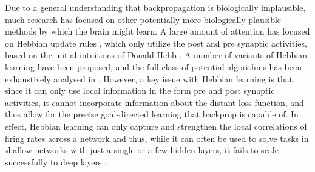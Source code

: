 Due to a general understanding that backpropagation is biologically implausible, much research has focused on other potentially more biologically plausible methods by which the brain might learn. A large amount of attention has focused on Hebbian update rules \citep{gerstner2002mathematical}, which only utilize the post and pre synaptic activities, based on the initial intuitions of Donald Hebb \citep{hebb1949first}. A number of variants of Hebbian learning have been proposed, and the full class of potential algorithms has been exhaustively analysed in \citep{baldi2016theory}. However, a key issue with Hebbian learning is that, since it can only use local information in the form pre and post synaptic activities, it cannot incorporate information about the distant loss function, and thus allow for the precise goal-directed learning that backprop is capable of. In effect, Hebbian learning can only capture and strengthen the local correlations of firing rates across a network and thus, while it can often be used to solve tasks in shallow networks with just a single or a few hidden layers, it fails to scale successfully to deep layers \citep{lillicrap2019backpropagation}.

